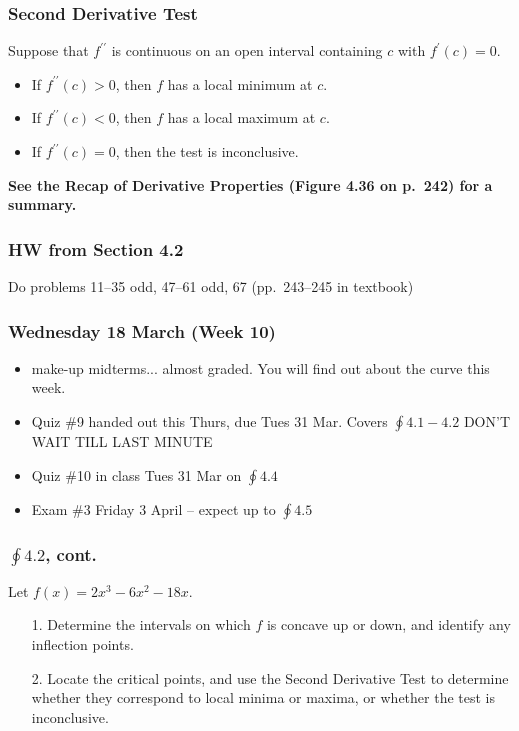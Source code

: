 \documentclass[14pt]{beamer}
\begin{document}
\begin{frame}
\frametitle{\small Second Derivative Test}
Suppose that $f^{\prime\prime}$ is continuous on an open interval containing $c$ with $f^{\prime}(c)=0$.

\begin{itemize}
\item If $f^{\prime\prime}(c)>0$, then $f$ has a \alert{local minimum} at $c$.

\vspace{0.5pc}
\item If $f^{\prime\prime}(c)<0$, then $f$ has a \alert{local maximum} at $c$.

\vspace{0.5pc}
\item If $f^{\prime\prime}(c)=0$, then the test is inconclusive.
\end{itemize}

\vspace{1pc}
{\bf See the Recap of Derivative Properties (Figure 4.36 on p.\ 242) for a summary.}
\end{frame}

\begin{frame}
\frametitle{HW from Section 4.2}
Do problems 11--35 odd, 47--61 odd, 67 (pp.\ 243--245 in textbook)
\end{frame}


\begin{frame}
\frametitle{Wednesday 18 March (Week 10)}
\small
\begin{itemize}
\item make-up midterms... almost graded.  You will find out about the curve this week.
\item Quiz \#9 handed out this Thurs, due Tues 31 Mar.  Covers $\oint 4.1-4.2$ DON'T WAIT TILL LAST MINUTE
\item Quiz \#10 in class Tues 31 Mar on $\oint 4.4$
\item Exam \#3 Friday 3 April -- expect up to $\oint 4.5$
\end{itemize}
\end{frame}

\begin{frame}%
\frametitle{\small $\oint 4.2$, cont.}
\begin{exe}
Let $f(x)=2x^3-6x^2-18x.$

\begin{itemize}
\item[1.] Determine the intervals on which $f$ is concave up or down, and identify any inflection points.

\vspace{0.5pc}
\item[2.] Locate the critical points, and use the Second Derivative Test to determine whether they correspond to local minima or maxima, or whether the test is inconclusive.
\end{itemize}
\end{exe}
\end{frame}
\end{document}
